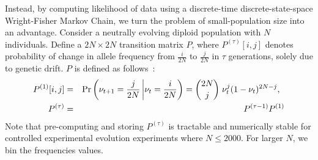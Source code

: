 \documentclass[11pt]{article}
\begin{document}
Instead, by computing likelihood of data using a discrete-time
discrete-state-space Wright-Fisher Markov Chain, we turn the problem
of small-population size into an advantage. Consider a neutrally
evolving diploid population with $N$ individuals. Define a
$2N\times2N$ transition matrix $P$, where $P^{(\tau)}[i,j]$ denotes
probability of change in allele frequency from $\frac{i}{2N}$ to
$\frac{j}{2N}$ in $\tau$ generations, solely due to genetic drift. $P$
is defined as follows~\cite{Ewens2012Mathematical}:
\begin{eqnarray}
  P^{(1)}[i,j] &=& \operatorname{Pr}\left(\nu_{t+1}=\frac{j}{2N} \left|
      \nu_{t}=\frac{i}{2N}\right)={2N \choose j} \right.  \nu_{t}^j
  (1-\nu_{t})^{2N-j}, \;\;\label{eq:P1}\\
  P^{(\tau)} &=&   P^{(\tau-1)}P^{(1)} \label{eq:Pt}
\end{eqnarray}
Note that pre-computing and storing $P^{(\tau)}$ is tractable and
numerically stable for controlled experimental evolution experiments
where $N\le2000$. For larger $N$, we bin the frequencies values.
\end{document}
